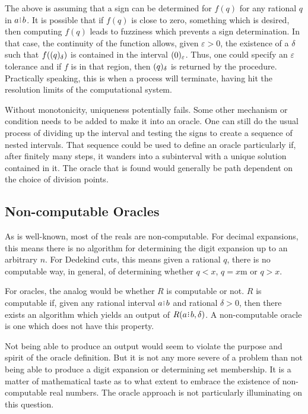 \documentclass[12pt]{article}
\begin{document}
The above is assuming that a sign can be determined for $f(q)$ for any rational $q$ in $a\rint b$. It is possible that if $f(q)$ is close to zero, something which is desired, then computing $f(q)$ leads to fuzziness which prevents a sign determination. In that case, the continuity of the function allows, given $\varepsilon > 0$, the existence of a $\delta$ such that $f(\halo{q})$ is contained in the interval $\halo[\varepsilon]{0}$. Thus, one could specify an $\varepsilon$ tolerance and if $f$ is in that region, then $\halo{q}$ is returned by the procedure. Practically speaking, this is when a process will terminate, having hit the resolution limits of the computational system. 

Without monotonicity, uniqueness potentially fails. Some other mechanism or condition needs to be added to make it into an oracle. One can still do the usual process of dividing up the interval and testing the signs to create a sequence of nested intervals. That sequence could be used to define an oracle particularly if, after finitely many steps, it wanders into a subinterval with a unique solution contained in it. The oracle that is found would generally be path dependent on the choice of division points. 

\subsection{Non-computable Oracles}

As is well-known, most of the reals are non-computable. For decimal expansions, this means there is no algorithm for determining the digit expansion up to an arbitrary $n$. For Dedekind cuts, this means given a rational $q$, there is no computable way, in general, of determining whether $q < x$, $q = x$m or $q > x$. 

For oracles, the analog would be whether $R$ is computable or not. $R$ is computable if, given any rational interval $a\rint b$ and rational $\delta > 0$, then there exists an algorithm which yields an output of $R(a\rint b, \delta)$. A non-computable oracle is one which does not have this property. 

Not being able to produce an output would seem to violate the purpose and spirit of the oracle definition. But it is not any more severe of a problem than not being able to produce a digit expansion or determining set membership. It is a matter of mathematical taste as to what extent to embrace the existence of non-computable real numbers. The oracle approach is not particularly illuminating on this question. 
\end{document}
